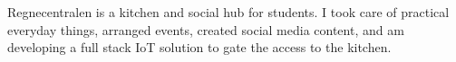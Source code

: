 Regnecentralen is a kitchen and social hub for students. I took care of practical
everyday things, arranged events, created social media content, and am
developing a full stack IoT solution to gate the access to the kitchen.
